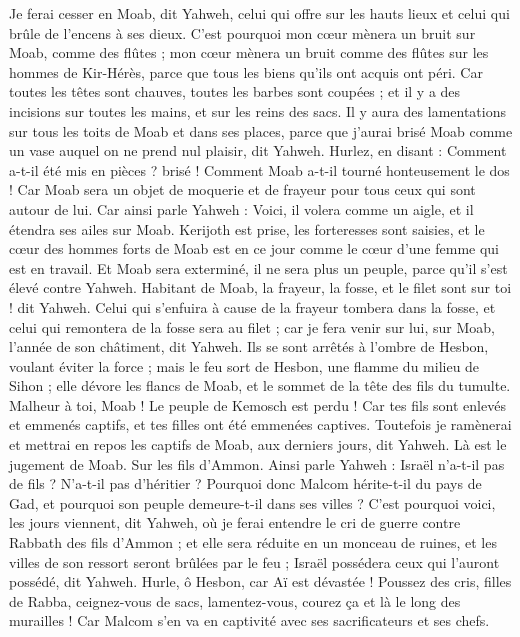 \begin{multicols}{2}
Je ferai cesser en Moab, dit Yahweh, celui qui offre sur les hauts lieux et celui qui brûle de l’encens à ses dieux. 
C’est pourquoi mon cœur mènera un bruit sur Moab, comme des flûtes ; mon cœur mènera un bruit comme des flûtes sur les hommes de Kir-Hérès, parce que tous les biens qu'ils ont acquis ont péri.
Car toutes les têtes sont chauves, toutes les barbes sont coupées ; et il y a des incisions sur toutes les mains, et sur les reins des sacs.
Il y aura des lamentations sur tous les toits de Moab et dans ses places, parce que j'aurai brisé Moab comme un vase auquel on ne prend nul plaisir, dit Yahweh.
Hurlez, en disant : Comment a-t-il été mis en pièces ? brisé ! Comment Moab a-t-il tourné honteusement le dos ! Car Moab sera un objet de moquerie et de frayeur pour tous ceux qui sont autour de lui.
Car ainsi parle Yahweh : Voici, il volera comme un aigle, et il étendra ses ailes sur Moab.
Kerijoth est prise, les forteresses sont saisies, et le cœur des hommes forts de Moab est en ce jour comme le cœur d'une femme qui est en travail.
Et Moab sera exterminé, il ne sera plus un peuple, parce qu'il s'est élevé contre Yahweh.
Habitant de Moab, la frayeur, la fosse, et le filet sont sur toi ! dit Yahweh.
Celui qui s'enfuira à cause de la frayeur tombera dans la fosse, et celui qui remontera de la fosse sera au filet ; car je fera venir sur lui, sur Moab, l'année de son châtiment, dit Yahweh.
Ils se sont arrêtés à l'ombre de Hesbon, voulant éviter la force ; mais le feu sort de Hesbon, une flamme du milieu de Sihon ; elle dévore les flancs de Moab, et le sommet de la tête des fils du tumulte.
Malheur à toi, Moab ! Le peuple de Kemosch est perdu ! Car tes fils sont enlevés et emmenés captifs, et tes filles ont été emmenées captives.
Toutefois je ramènerai et mettrai en repos les captifs de Moab, aux derniers jours, dit Yahweh. Là est le jugement de Moab.
\VerseOne{}Sur les fils d'Ammon. Ainsi parle Yahweh : Israël n'a-t-il pas de fils ? N'a-t-il pas d'héritier ? Pourquoi donc Malcom hérite-t-il du pays de Gad, et pourquoi son peuple demeure-t-il dans ses villes ?
C'est pourquoi voici, les jours viennent, dit Yahweh, où je ferai entendre le cri de guerre contre Rabbath des fils d'Ammon ; et elle sera réduite en un monceau de ruines, et les villes de son ressort seront brûlées par le feu ; Israël possédera ceux qui l'auront possédé, dit Yahweh.
Hurle, ô Hesbon, car Aï est dévastée ! Poussez des cris, filles de Rabba, ceignez-vous de sacs, lamentez-vous, courez ça et là le long des murailles ! Car Malcom s'en va en captivité avec ses sacrificateurs et ses chefs.

\end{multicols}
